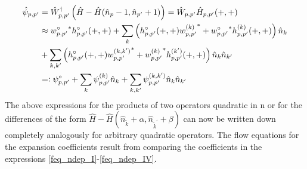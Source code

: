 \begin{appendix}
\begin{subequations}
\begin{align}
\hat\psi_{p,p^\prime}&=\hat W^\dagger_{p,p^\prime} \left(\hat H - \hat H(\hat n_p-1,\hat n_{p^\prime}+1)\right)=\hat W_{p,p^\prime}\hat H_{p,p^\prime}(+,+)\nonumber\\
&\approx  {w_{p,p^\prime}^{\circ}}^*h^{\circ}_{p,p^\prime}(+,+)+\sum\limits_k \left(h^\circ_{p,p^\prime}(+,+) {w_{p,p^\prime}^{(k)}}^* + {w_{p,p^\prime}^{\circ}}^*h^{(k)}_{p,p^\prime}(+,+)\right)\hat n_k \nonumber\\
&+ \sum\limits_{k,k^\prime} \left( h^\circ_{p,p^\prime}(+,+) {w_{p,p^\prime}^{(k,k^\prime)}}^*+{w_{p,p^\prime}^{(k)}}^*h^{(k^\prime)}_{p,p^\prime}(+,+)\right)\hat n_k\hat n_{k^\prime}\nonumber\\
&=\vcentcolon {\psi_{p,p^\prime}^{\circ}} + \sum\limits_k {\psi_{p,p^\prime}^{(k)}}\hat n_k + \sum\limits_{k,k^\prime} {\psi_{p,p^\prime}^{(k,k^\prime)}}\hat n_k\hat n_ {k^\prime}
\end{align}
\end{subequations}
The above expressions for the products of two operators quadratic in n or for the differences of the form $\hat H - \hat H(\hat n_{\tilde k}+\alpha,\hat n_{\tilde k^\prime}+\beta)$
 can now be written down completely analogously for arbitrary quadratic operators. The flow equations for the expansion coefficients result from comparing the coefficients in the expressions  \ref{feq_ndep_I}-\ref{feq_ndep_IV}.

























\end{appendix}
